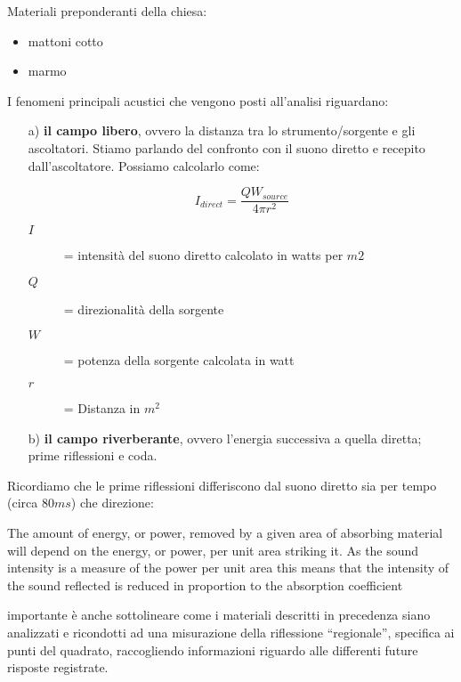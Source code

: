 Materiali preponderanti della chiesa:

\begin{itemize}
	\item mattoni cotto
	\item marmo
\end{itemize}

I fenomeni principali acustici che vengono posti all'analisi riguardano:

\begin{enumerate}
	\item[a)] \textbf{il campo libero}, ovvero la distanza tra lo strumento/sorgente e gli ascoltatori. 
Stiamo parlando del confronto con il suono diretto e recepito dall'ascoltatore. Possiamo calcolarlo come:

\begin{equation}
I_{direct} = \frac{QW_{source}}{4\pi r^2}
\end{equation}

	\begin{description}
		\item[$I$] = intensità del suono diretto calcolato in watts per $m2$
		\item[$Q$] = direzionalità della sorgente 
		\item[$W$] = potenza della sorgente calcolata in watt 
		\item[$r$] = Distanza in $m^2$
	\end{description}
		
	\item[b)] \textbf{il campo riverberante}, ovvero l'energia successiva a quella diretta; prime riflessioni e coda.

\end{enumerate}

Ricordiamo che le prime riflessioni differiscono dal suono diretto sia per tempo (circa $80ms$) che direzione:


\begin{quoting}
The amount of energy, or power, removed by a given area of absorbing material will depend on the energy,
or power, per unit area striking it. As the sound intensity is a measure of the power per unit area this
means that the intensity of the sound reflected is reduced in proportion to the absorption
coefficient\cite{howjamie:misur} %
\end{quoting}

importante è anche sottolineare come i materiali descritti in precedenza siano analizzati e ricondotti ad
una misurazione della riflessione “regionale”, specifica ai punti del quadrato, raccogliendo informazioni
riguardo alle differenti future risposte registrate.


